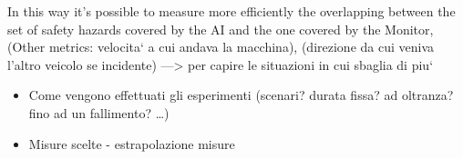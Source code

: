 In this way it's possible to measure more efficiently the overlapping between the set of safety hazards covered by the AI and the one covered by the Monitor,
(Other metrics: velocita` a cui andava la macchina), (direzione da cui veniva l'altro veicolo se incidente)
---> per capire le situazioni in cui sbaglia di piu`

	\begin{itemize}
		
		\item Come vengono effettuati gli esperimenti (scenari? durata fissa? ad oltranza? fino ad un fallimento? \dots)
		\item Misure scelte - estrapolazione misure
		
	\end{itemize}
